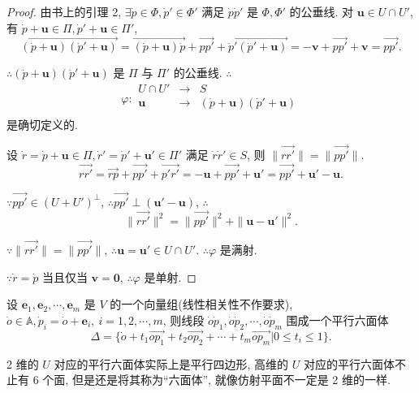 \documentclass[color=black,device=normal,lang=cn,mode=geye]{elegantnote}
\begin{document}
\begin{proof}
    由书上的引理 2, $\exists\dot{p}\in\varPhi,\dot{p}'\in\varPhi'$ 满足 $\dot{p}\dot{p}'$ 是 $\varPhi,\varPhi'$ 的公垂线. 对 $\boldsymbol{u}\in U\cap U'$, 有 $\dot{p}+\boldsymbol{u}\in\varPi,\dot{p}'+\boldsymbol{u}\in\varPi'$,
    \[\overrightarrow{(\dot{p}+\boldsymbol{u})(\dot{p}'+\boldsymbol{u})}=\overrightarrow{(\dot{p}+\boldsymbol{u})\dot{p}}+\overrightarrow{pp'}+\overrightarrow{\dot{p}'(\dot{p}'+\boldsymbol{u})}=-\boldsymbol{v}+\overrightarrow{pp'}+\boldsymbol{v}=\overrightarrow{pp'}.\]

    $\therefore(\dot{p}+\boldsymbol{u})(\dot{p}'+\boldsymbol{u})$ 是 $\varPi$ 与 $\varPi'$ 的公垂线. $\therefore$
    \[\varphi:\begin{array}{rcl}
        U\cap U' & \to & S \\
        \boldsymbol{u} & \to & (\dot{p}+\boldsymbol{u})(\dot{p}'+\boldsymbol{u}) \\
    \end{array}\]
    是确切定义的.

    设 $\dot{r}=\dot{p}+\boldsymbol{u}\in\varPi,\dot{r}'=\dot{p}'+\boldsymbol{u}'\in\varPi'$ 满足 $\dot{r}\dot{r}'\in S$, 则 $\|\overrightarrow{rr'}\|=\|\overrightarrow{pp'}\|$.
    \[\overrightarrow{rr'}=\overrightarrow{rp}+\overrightarrow{pp'}+\overrightarrow{p'r'}=-\boldsymbol{u}+\overrightarrow{pp'}+\boldsymbol{u}'=\overrightarrow{pp'}+\boldsymbol{u}'-\boldsymbol{u}.\]

    $\because\overrightarrow{pp'}\in(U+U')^\perp$, $\therefore\overrightarrow{pp'}\perp(\boldsymbol{u}'-\boldsymbol{u})$, $\therefore$
    \[\|\overrightarrow{rr'}\|^2=\|\overrightarrow{pp'}\|^2+\|\boldsymbol{u}-\boldsymbol{u}'\|^2.\]

    $\because\|\overrightarrow{rr'}\|=\|\overrightarrow{pp'}\|$, $\therefore\boldsymbol{u}=\boldsymbol{u}'\in U\cap U'$. $\therefore\varphi$ 是满射.

    $\because\dot{r}=\dot{p}$ 当且仅当 $\boldsymbol{v}=\boldsymbol{0}$, $\therefore\varphi$ 是单射.
\end{proof}
设 $\boldsymbol{e}_1,\boldsymbol{e}_2,\cdots,\boldsymbol{e}_m$ 是 $V$ 的一个向量组(线性相关性不作要求), $\dot{o}\in\mathbb{A},\dot{p}_i=\dot{o}+\boldsymbol{e}_i,\ i=1,2,\cdots,m$, 则线段 $\dot{o}\dot{p}_1,\dot{o}\dot{p}_2,\cdots,\dot{o}\dot{p}_m$ 围成一个平行六面体
\[\Delta=\{\dot{o}+t_1\overrightarrow{op_1}+t_2\overrightarrow{op_2}+\cdots+t_m\overrightarrow{op_m}|0\leq t_i\leq1\}.\]

2 维的 $U$ 对应的平行六面体实际上是平行四边形, 高维的 $U$ 对应的平行六面体不止有 6 个面, 但是还是将其称为``六面体'', 就像仿射平面不一定是 2 维的一样.
\end{document}

